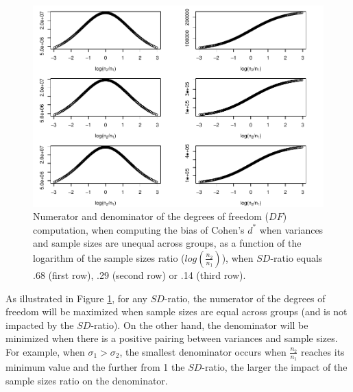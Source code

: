 \documentclass[
  english,
  man,mask]{apa6}
\begin{document}
\begin{figure}
\centering
\includegraphics{Theoretical-Bias-of-all-estimators-as-a-function-of-population-parameters_files/figure-latex/dfnumdenomcohendprimehetunbalnratiosdratio2-1.pdf}
\caption{\label{fig:dfnumdenomcohendprimehetunbalnratiosdratio2}Numerator and denominator of the degrees of freedom (\(DF\)) computation, when computing the bias of Cohen's \(d^*\) when variances and sample sizes are unequal across groups, as a function of the logarithm of the sample sizes ratio (\(log \left( \frac{n_2}{n_1} \right)\)), when \(SD\)-ratio equals .68 (first row), .29 (second row) or .14 (third row).}
\end{figure}

As illustrated in Figure \ref{fig:dfnumdenomcohendprimehetunbalnratiosdratio2}, for any \(SD\)-ratio, the numerator of the degrees of freedom will be maximized when sample sizes are equal across groups (and is not impacted by the \(SD\)-ratio). On the other hand, the denominator will be minimized when there is a positive pairing between variances and sample sizes. For example, when \(\sigma_1 > \sigma_2\), the smallest denominator occurs when \(\frac{n_2}{n_1}\) reaches its minimum value and the further from 1 the \(SD\)-ratio, the larger the impact of the sample sizes ratio on the denominator.
\end{document}

